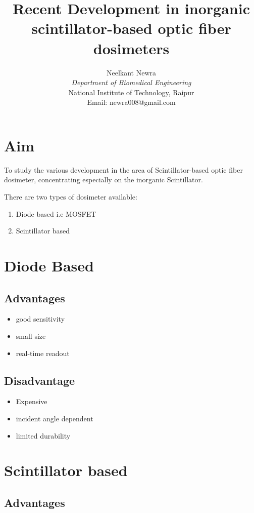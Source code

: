 \documentclass{article}
\title{\textbf{Recent Development in inorganic scintillator-based optic fiber dosimeters}}
\author{Neelkant Newra \\ \textit{Department of Biomedical Engineering} \\ National Institute of Technology, Raipur \\ Email: newra008@gmail.com}
\begin{document}
\maketitle


\section*{Aim}
To study the various development in the area of Scintillator-based optic fiber dosimeter, concentrating especially on the inorganic Scintillator. 
\\

\begin{multicols}{2}
\noindent There are two types of dosimeter available:
\begin{enumerate}
    \item Diode based i.e MOSFET
    \item Scintillator based
\end{enumerate}

\section{Diode Based}

\subsection{Advantages}
\begin{itemize}
    \item good sensitivity
    \item small size
    \item real-time readout
\end{itemize}

\subsection{Disadvantage}
\begin{itemize}
    \item Expensive
    \item incident angle dependent
    \item limited durability
\end{itemize}

\section{Scintillator based}

\subsection{Advantages}
\begin{itemize}
    

\end{itemize}
\end{multicols}
\end{document}
